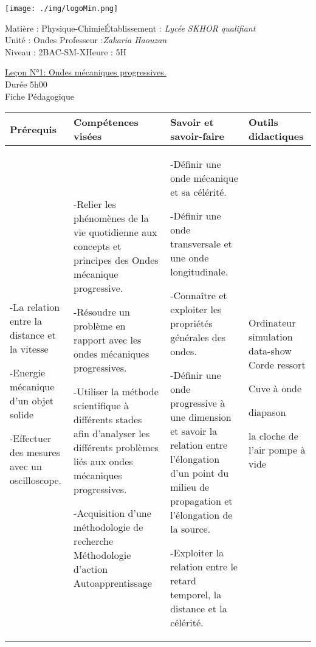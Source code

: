 \documentclass[12pt]{article}
\newcommand\headerMe[2]{\noindent{}#1\hfill#2}
\begin{document}
\begin{center}
\texttt{[image: ./img/logoMin.png]}
\vspace{-3cm}
\end{center}
\headerMe{Matière : Physique-Chimie}{Établissement : \emph{Lycée SKHOR qualifiant}}\\
\headerMe{ Unité : Ondes }{  Professeur :\emph{Zakaria Haouzan}}\\
\headerMe{Niveau : 2BAC-SM-X}{Heure : 5H}\\

\begin{center}
\underline{Leçon N°1: Ondes mécaniques progressives.}\\
Durée 5h00
\\
    \vspace{.2cm}
\hrulefill
\Large{Fiche Pédagogique}
\hrulefill\\
\end{center}


 \begin{center}
	 \begin{tabular}{|p{}||p{}||p{}||p{}|}
\hline
\textbf{Prérequis} & \textbf{Compétences visées } & \textbf{Savoir et savoir-faire}&\textbf{Outils didactiques }\\
    \hline
	 -La relation entre la distance
	et la vitesse

	-Energie mécanique d’un
objet solide

-Effectuer des mesures avec un oscilloscope.
				   &
				 -Relier les phénomènes de la
vie quotidienne aux concepts
et principes des Ondes mécanique progressive.

-Résoudre un problème en rapport avec les ondes mécaniques progressives.

-Utiliser la méthode scientifique à différents stades afin d'analyser les différents problèmes liés aux ondes mécaniques progressives.

-Acquisition d'une
méthodologie de recherche
Méthodologie d'action Autoapprentissage

 & 

-Définir une onde mécanique et
sa célérité.

-Définir une onde transversale
et une onde longitudinale.

-Connaître et exploiter les
propriétés générales des
ondes.

-Définir une onde progressive à
une dimension et savoir la
relation entre l'élongation d'un
point du milieu de
propagation et l'élongation de
la source.

-Exploiter la relation entre le
retard temporel, la distance
et la célérité.


 & Ordinateur  simulation data-show 
Corde   ressort 

Cuve à onde  

diapason

la cloche de l’air pompe à vide
\\
    \hline
\end{tabular} 
\end{center}
\end{document}

